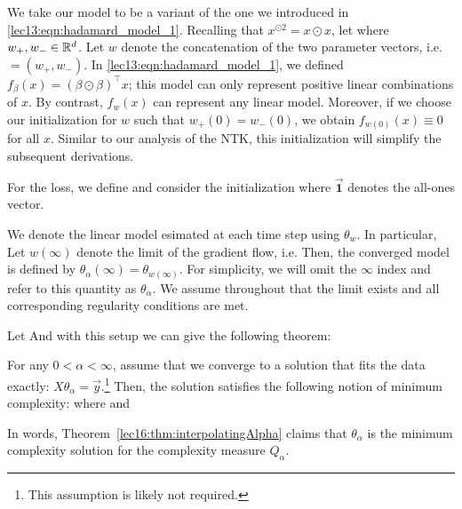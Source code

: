 We take our model to be a variant of the one we introduced in \eqref{lec13:eqn:hadamard_model_1}. Recalling that $x^{\odot 2} = x \odot x$, let
where $w_+, w_- \in \mathbb R^d$. Let $w$ denote the concatenation of the two parameter vectors, i.e. $= (w_+, w_-)$.  In \eqref{lec13:eqn:hadamard_model_1}, we defined $f_\beta(x) = (\beta \odot \beta)^\top x$; this model can only represent positive linear combinations of $x$.  By contrast, $f_w(x)$ can represent any linear model. Moreover, if we choose our initialization for $w$ such that $w_+(0) = w_-(0)$, we obtain $f_{w(0)}(x) \equiv 0$ for all $x$. Similar to our analysis of the NTK, this initialization will simplify the subsequent derivations.

For the loss, we define
and consider the initialization
where $\vec{\mathbf{1}}$ denotes the all-ones vector.

We denote the linear model esimated at each time step using $\theta_w$. In particular,
Let $w(\infty)$ denote the limit of the gradient flow, i.e.
Then, the converged model is defined by $\theta_\alpha(\infty) = \theta_{w(\infty)}$.  For simplicity, we will omit the $\infty$ index and refer to this quantity as $\theta_\alpha$. We assume throughout that the limit exists and all corresponding regularity conditions are met.

Let
And with this setup we can give the following theorem:
\begin{theorem} \label{lec16:thm:interpolatingAlpha}
For any $0 < \alpha < \infty$, assume that we converge to a solution that fits the data exactly: $X \theta_{\alpha} = \vec{y}$.\footnote{This assumption is likely not required.}  Then, the solution satisfies the following notion of minimum complexity:
where
and
\end{theorem}
In words, Theorem~\ref{lec16:thm:interpolatingAlpha} claims that $\theta_\alpha$ is the minimum complexity solution for the complexity measure $Q_\alpha$.

